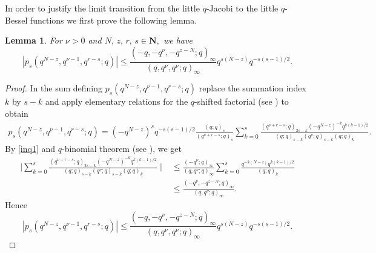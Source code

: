 \documentclass[12pt,a4paper]{amsart}
\numberwithin{equation}{section}
\theoremstyle{plain}
\newtheorem{lemma}[theorem]{Lemma}
\theoremstyle{definition}
\theoremstyle{remark}
\numberwithin{equation}{section}
\numberwithin{table}{section}
\numberwithin{figure}{section}
\begin{document}
In order to justify the limit transition from the little $q$-Jacobi
to the little $q$-Bessel functions we first prove the following
lemma.
\begin{lemma} For  $\nu >0$ and $N,\,z,\,r,\,s \in
\mathbf{N},$ we have
\begin{equation*}
|p_{s}(q^{N-z},q^{\nu-1},q^{r-s};q)|\leq
\frac{(-q,-q^{\nu},-q^{z-N};q)_{\infty}}{(q,q^{\nu},q^{\nu};q)_{\infty}}q^{s(N-z)}q^{-s(s-1)/2}.
\end{equation*}
\end{lemma}
\begin{proof} In the sum defining $p_{s}(q^{N-z},q^{\nu-1},q^{r-s};q)$
replace the summation index $k$ by $s-k$ and apply elementary
relations for the $q$-shifted factorial (see \cite{GR}) to obtain
\begin{align*}
p_{s}(q^{N-z},q^{\nu-1},q^{r-s};q)=(-q^{N-z})^sq^{-s(s-1)/2}\frac{(q;q)_s}{(q^{\nu+r-s};q)_s}
\sum_{k=0}^{s}\frac{(q^{\nu+r-s};q)_{2s-k}(-q^{N-z})^{-k}q^{k(k-1)/2}}{(q;q)_{s-k}(q^{\nu};q)_{s-k}(q;q)_k}.
\end{align*}
By \eqref{inq1} and $q$-binomial theorem (see \cite{GR}), we get
\begin{align*}
\mid\sum_{k=0}^{s}\frac{(q^{\nu+r-s};q)_{2s-k}(-q^{N-z})^{-k}q^{k(k-1)/2}}{(q;q)_{s-k}(q^{\nu};q)_{s-k}(q;q)_k}\mid
& \leq
\frac{(-q^{\nu};q)_{\infty}}{(q,q^{\nu};q)_{\infty}}\sum_{k=0}^{s}\frac{q^{-k(N-z)}q^{k(k-1)/2}}{(q;q)_k}
\\& \leq
\frac{(-q^{\nu},-q^{z-N};q)_{\infty}}{(q,q^{\nu};q)_{\infty}}.
\end{align*}
Hence
\begin{equation*}
|p_{s}(q^{N-z},q^{\nu-1},q^{r-s};q)|\leq
\frac{(-q,-q^{\nu},-q^{z-N};q)_{\infty}}{(q,q^{\nu},q^{\nu};q)_{\infty}}q^{s(N-z)}q^{-s(s-1)/2}.
\end{equation*}
\end{proof}
\end{document}
